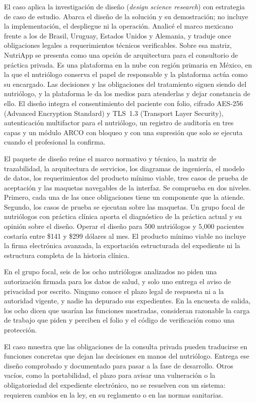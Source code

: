 \documentclass[12pt, a4paper]{article}
\begin{document}
El caso aplica la investigación de diseño (\textit{design science
research}) con estrategia de caso de estudio. Abarca el diseño de la
solución y su demostración; no incluye la implementación, el despliegue
ni la operación. Analicé el marco mexicano frente a los de Brasil,
Uruguay, Estados Unidos y Alemania, y traduje once obligaciones
legales a requerimientos técnicos verificables. Sobre esa matriz,
NutriApp se presenta como una opción de arquitectura para el consultorio
de práctica privada. Es una plataforma en la nube con región primaria en
México, en la que el nutriólogo conserva el papel de responsable y la
plataforma actúa como su encargado. Las decisiones y las
obligaciones del tratamiento siguen siendo del nutriólogo, y la
plataforma le da los medios para atenderlas y dejar constancia de ello.
El diseño integra el consentimiento del paciente con folio, cifrado AES-256 (Advanced Encryption Standard) y TLS~1.3 (Transport Layer Security), autenticación multifactor para el nutriólogo, un
registro de auditoría en tres capas y un módulo ARCO con bloqueo y con
una supresión que solo se ejecuta cuando el profesional la confirma.
 
El paquete de diseño reúne el marco normativo y técnico, la matriz de
trazabilidad, la arquitectura de servicios, los diagramas de ingeniería,
el modelo de datos, los requerimientos del producto mínimo viable, tres
casos de prueba de aceptación y las maquetas navegables de la interfaz.
Se comprueba en dos niveles. Primero, cada una de las once obligaciones
tiene un componente que la atiende. Segundo, los casos de prueba se
ejecutan sobre las maquetas. Un grupo focal de nutriólogos con
práctica clínica aporta el diagnóstico de la práctica actual y su opinión sobre el diseño. Operar el diseño para 500 nutriólogos
y 5,000 pacientes costaría entre \$141 y \$299 dólares al mes. El producto mínimo viable no incluye la firma electrónica
avanzada, la exportación estructurada del expediente ni la estructura
completa de la historia clínica.
 
En el grupo focal, seis de los ocho nutriólogos analizados no piden una autorización firmada para los datos de salud, y solo uno entrega el
aviso de privacidad por escrito. Ninguno conoce el plazo legal de
respuesta ni a la autoridad vigente, y nadie ha depurado sus expedientes. En la encuesta de salida, los ocho dicen que usarían las
funciones mostradas, consideran razonable la carga de trabajo que piden
y perciben el folio y el código de verificación como una protección.
 
El caso muestra que las obligaciones de la consulta privada pueden
traducirse en funciones concretas que dejan las decisiones en manos del
nutriólogo. Entrega ese diseño comprobado y documentado para pasar a la
fase de desarrollo. Otros vacíos, como la portabilidad, el plazo para
avisar una vulneración o la obligatoriedad del expediente electrónico,
no se resuelven con un sistema: requieren cambios en la ley, en su
reglamento o en las normas sanitarias.
 
\end{document}
